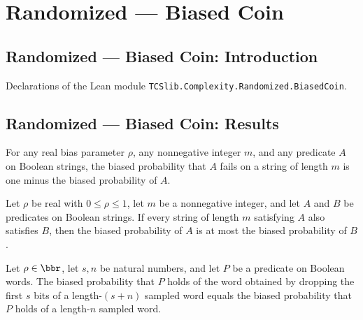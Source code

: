 \section{Randomized --- Biased Coin}
\subsection*{Randomized --- Biased Coin: Introduction}

Declarations of the Lean module \texttt{TCSlib.Complexity.Randomized.BiasedCoin}.

\subsection*{Randomized --- Biased Coin: Results}

\begin{theorem}
\label{Randomized.biasedProb_not}
\leanok
{}
For any real bias parameter $\rho$, any nonnegative integer $m$, and any predicate $A$
on Boolean strings, the biased probability that $A$ fails on a string of length $m$ is
one minus the biased probability of $A$.
\end{theorem}

\begin{theorem}
\label{Randomized.biasedProb_mono}
\leanok
{}
Let $\rho$ be real with $0\leq \rho\leq 1$, let $m$ be a nonnegative integer, and let
$A$ and $B$ be predicates on Boolean strings. If every string of length $m$ satisfying
$A$ also satisfies $B$, then the biased probability of $A$ is at most the biased
probability of $B$.
\end{theorem}

\begin{theorem}
\label{Randomized.biasedProb_drop}
\leanok
{}
Let $\rho\in\bbr$, let $s,n$ be natural numbers, and let $P$ be a predicate on Boolean
words. The biased probability that $P$ holds of the word obtained by dropping the first
$s$ bits of a length-$(s+n)$ sampled word equals the biased probability that $P$ holds
of a length-$n$ sampled word.
\end{theorem}

